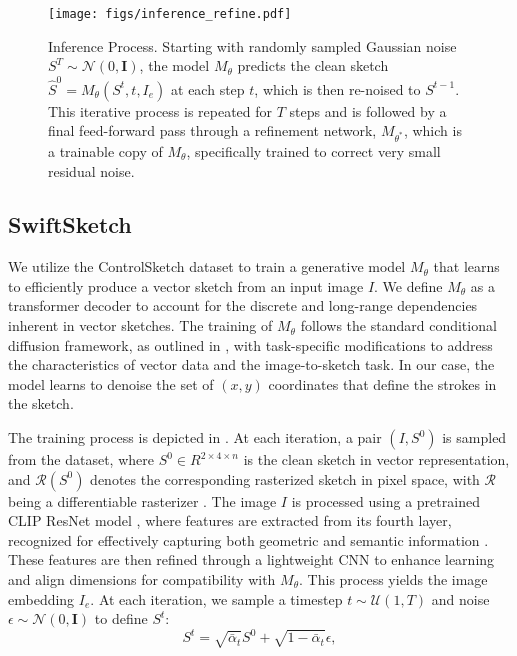 \begin{figure}
    \centering
    \texttt{[image: figs/inference\_refine.pdf]}
    \vspace{-0.4cm}
    \caption{Inference Process. Starting with randomly sampled Gaussian noise $S^T \sim \mathcal{N}(0, \mathbf{I})$, the model $M_{\theta}$ predicts the clean sketch $\hat{S}^0 = M_{\theta}(S^t, t, I_e)$ at each step $t$, which is then re-noised to $S^{t-1}$. This iterative process is repeated for $T$ steps and is followed by a final feed-forward pass through a refinement network, $M_{\theta^*}$, which is a trainable copy of $M_{\theta}$, specifically trained to correct very small residual noise.}
    \label{fig:Inference}
\end{figure}




\subsection{SwiftSketch}
\label{sec:swiftsketch}
We utilize the ControlSketch dataset to train a generative model $M_{\theta}$ that learns to efficiently produce a vector sketch from an input image $I$.
We define $M_{\theta}$ as a transformer decoder to account for the discrete and long-range dependencies inherent in vector sketches.
The training of $M_{\theta}$ follows the standard conditional diffusion framework, as outlined in , with task-specific modifications to address the characteristics of vector data and the image-to-sketch task. In our case, the model learns to denoise the set of $(x,y)$ coordinates that define the strokes in the sketch. 

The training process is depicted in . 
At each iteration, a pair $(I, S^0)$ is sampled from the dataset, where $S^0\in R^{2\times 4 \times n}$ is the clean sketch in vector representation, and $\mathcal{R}(S^0)$ denotes the corresponding rasterized sketch in pixel space, with $\mathcal{R}$ being a differentiable rasterizer \cite{Li2020DifferentiableVG}. 
The image $I$ is processed using a pretrained CLIP ResNet model \cite{Radfordclip}, where features are extracted from its fourth layer, recognized for effectively capturing both geometric and semantic information \cite{vinker2022clipasso}. These features are then refined through a lightweight CNN to enhance learning and align dimensions for compatibility with $M_\theta$. This process yields the image embedding $I_e$.
At each iteration, we sample a timestep $t \sim \mathcal{U}(1,T)$ and noise $\epsilon \sim \mathcal{N}(0, \mathbf{I})$ to define $S^t$:
\begin{equation}
S^t = \sqrt{\bar{\alpha}_t} S^0 + \sqrt{1 - \bar{\alpha}_t} \epsilon,
\label{eq:St}
\end{equation} 

